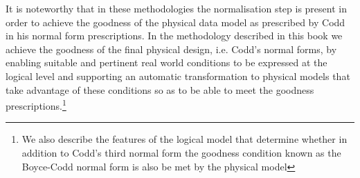 It is noteworthy that in these methodologies the normalisation step is present in order to achieve the goodness of the physical data model as prescribed by Codd in his normal form prescriptions. In the methodology described in this book we achieve the goodness of the final physical design, i.e. Codd's normal forms, by enabling suitable and pertinent real world conditions to be expressed at the logical level and supporting an automatic transformation to physical models that take advantage of these conditions so as to be able to meet the goodness prescriptions.\footnote{We also describe the features of the logical model that determine whether in addition to Codd's third normal form the goodness condition known as the Boyce-Codd normal form is also be met by the physical model}

